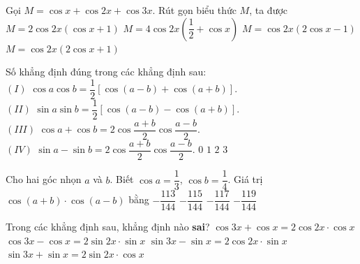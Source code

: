 \begin{ex}%
	Gọi $M = \cos x  + \cos 2x + \cos 3x$. Rút gọn biểu thức $M$, ta được
	 \choice
		{$M = 2 \cos 2x (\cos x +  1)$}
		{$M = 4 \cos 2x \left(\dfrac{1}{2} + \cos  x\right)$}
		{$M =  \cos 2x (2 \cos x - 1)$}
		{\True $M = \cos 2x (2  \cos x + 1)$}
\end{ex}

\begin{ex}%
	Số  khẳng định đúng trong các khẳng định sau:\\
	 $(I)$ $\cos a\cos b=\dfrac {1}{2}\left[\cos (a-b)+\cos (a+b)\right]$.\\
	$(II)$ $\sin a\sin b=\dfrac {1}{2}\left[\cos (a-b)-\cos (a+b)\right]$.\\ 
	$(III)$ $\cos a+\cos b=2\cos \dfrac {a+b}{2}\cos \dfrac  {a-b}{2}$.\\
	$(IV)$ $\sin a-\sin b=2\cos \dfrac {a+b}{2}\cos  \dfrac {a-b}{2}$.
	 \choice
		 {$0$}
		{$1$} 
		{$2$} 
		{\True  $3$}
\end{ex}

\begin{ex}%
	Cho hai góc nhọn $a$ và $b$. Biết $\cos a=\dfrac{1}{3}$, $\cos b=\dfrac{1}{4}$. Giá trị  $\cos\left(a+b\right)\cdot\cos\left(a-b\right)$ bằng
	 \choice
		{$-\dfrac{113}{144}$} 
		 {$-\dfrac{115}{144}$}
		{$-\dfrac{117}{144}$} 
		 {\True $-\dfrac{119}{144}$}
\end{ex}

\begin{ex}%
	Trong các khẳng định sau, khẳng định  nào \textbf{sai}?
	\choice 
		{$\cos 3x+\cos x=2\cos 2x\cdot  \cos x$}
		{\True $\cos 3x-\cos  x=2\sin 2x\cdot \sin x$}
		{$\sin 3x-\sin  x=2\cos 2x\cdot \sin x$}
		{$\sin 3x+\sin x=2\sin  2x\cdot \cos x$}
\end{ex}


